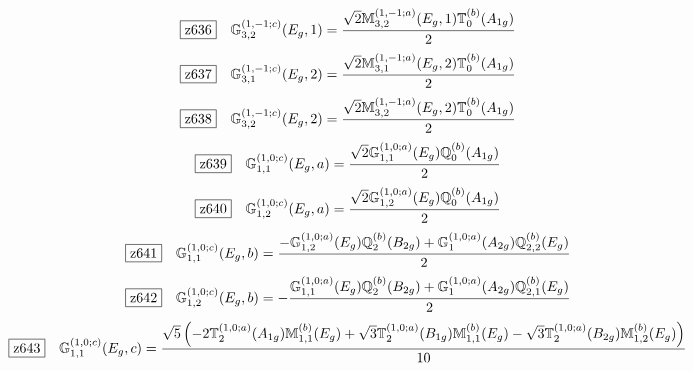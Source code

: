 \documentclass[fleqn,10pt,landscape]{jsarticle}
\begin{document}
\begin{dmath*}
\hspace*{3mm}\fbox{z636}\quad \mathbb{G}_{3,2}^{(1,-1;c)}(E_{g},1)=\frac{\sqrt{2} \mathbb{M}_{3,2}^{(1,-1;a)}(E_{g},1) \mathbb{T}_{0}^{(b)}(A_{1g})}{2}
\end{dmath*}
\begin{dmath*}
\hspace*{3mm}\fbox{z637}\quad \mathbb{G}_{3,1}^{(1,-1;c)}(E_{g},2)=\frac{\sqrt{2} \mathbb{M}_{3,1}^{(1,-1;a)}(E_{g},2) \mathbb{T}_{0}^{(b)}(A_{1g})}{2}
\end{dmath*}
\begin{dmath*}
\hspace*{3mm}\fbox{z638}\quad \mathbb{G}_{3,2}^{(1,-1;c)}(E_{g},2)=\frac{\sqrt{2} \mathbb{M}_{3,2}^{(1,-1;a)}(E_{g},2) \mathbb{T}_{0}^{(b)}(A_{1g})}{2}
\end{dmath*}
\begin{dmath*}
\hspace*{3mm}\fbox{z639}\quad \mathbb{G}_{1,1}^{(1,0;c)}(E_{g},a)=\frac{\sqrt{2} \mathbb{G}_{1,1}^{(1,0;a)}(E_{g}) \mathbb{Q}_{0}^{(b)}(A_{1g})}{2}
\end{dmath*}
\begin{dmath*}
\hspace*{3mm}\fbox{z640}\quad \mathbb{G}_{1,2}^{(1,0;c)}(E_{g},a)=\frac{\sqrt{2} \mathbb{G}_{1,2}^{(1,0;a)}(E_{g}) \mathbb{Q}_{0}^{(b)}(A_{1g})}{2}
\end{dmath*}
\begin{dmath*}
\hspace*{3mm}\fbox{z641}\quad \mathbb{G}_{1,1}^{(1,0;c)}(E_{g},b)=\frac{- \mathbb{G}_{1,2}^{(1,0;a)}(E_{g}) \mathbb{Q}_{2}^{(b)}(B_{2g}) + \mathbb{G}_{1}^{(1,0;a)}(A_{2g}) \mathbb{Q}_{2,2}^{(b)}(E_{g})}{2}
\end{dmath*}
\begin{dmath*}
\hspace*{3mm}\fbox{z642}\quad \mathbb{G}_{1,2}^{(1,0;c)}(E_{g},b)=- \frac{\mathbb{G}_{1,1}^{(1,0;a)}(E_{g}) \mathbb{Q}_{2}^{(b)}(B_{2g}) + \mathbb{G}_{1}^{(1,0;a)}(A_{2g}) \mathbb{Q}_{2,1}^{(b)}(E_{g})}{2}
\end{dmath*}
\begin{dmath*}
\hspace*{3mm}\fbox{z643}\quad \mathbb{G}_{1,1}^{(1,0;c)}(E_{g},c)=\frac{\sqrt{5} \left(- 2 \mathbb{T}_{2}^{(1,0;a)}(A_{1g}) \mathbb{M}_{1,1}^{(b)}(E_{g}) + \sqrt{3} \mathbb{T}_{2}^{(1,0;a)}(B_{1g}) \mathbb{M}_{1,1}^{(b)}(E_{g}) - \sqrt{3} \mathbb{T}_{2}^{(1,0;a)}(B_{2g}) \mathbb{M}_{1,2}^{(b)}(E_{g})\right)}{10}
\end{dmath*}
\end{document}
